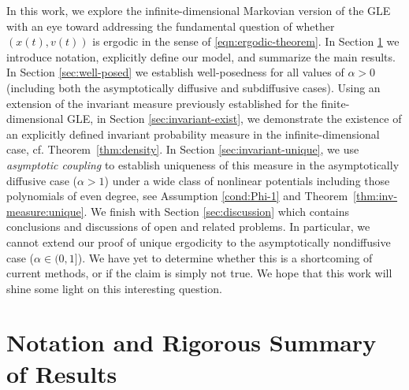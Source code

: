 \documentclass[11pt]{amsart}
\theoremstyle{definition}
\theoremstyle{definition}
\theoremstyle{plain}
\numberwithin{equation}{section}
\begin{document}
In this work, we explore the infinite-dimensional Markovian version of the GLE with an eye toward addressing the fundamental question of whether $(x(t),v(t))$ is ergodic in the sense of \eqref{eqn:ergodic-theorem}. In Section \ref{sec:results} we introduce notation, explicitly define our model, and summarize the main results. In Section \ref{sec:well-posed} we establish well-posedness for all values of $\alpha > 0$ (including both the asymptotically diffusive and subdiffusive cases). Using an extension of the invariant measure previously established for the finite-dimensional GLE, in Section \ref{sec:invariant-exist}, we demonstrate the existence of an explicitly defined invariant probability measure in the infinite-dimensional case, cf. Theorem~\ref{thm:density}. In Section \ref{sec:invariant-unique}, we use \emph{asymptotic coupling} \cite{weinan2001gibbsian,mattingly2002exponential, hairer2011asymptotic} to establish uniqueness of this measure in the asymptotically diffusive case ($\alpha>1$) under a wide class of nonlinear potentials including those polynomials of even degree, see Assumption \ref{cond:Phi-1} and Theorem~\ref{thm:inv-measure:unique}. We finish with Section \ref{sec:discussion} which contains conclusions and discussions of open and related problems. In particular, we cannot extend our proof of unique ergodicity to the asymptotically nondiffusive case ($\alpha\in(0,1]$). We have yet to determine whether this is a shortcoming of current methods, or if the claim is simply not true. We hope that this work will shine some light on this interesting question.




\section{Notation and Rigorous Summary of Results}

\label{sec:results}
 
\end{document}
